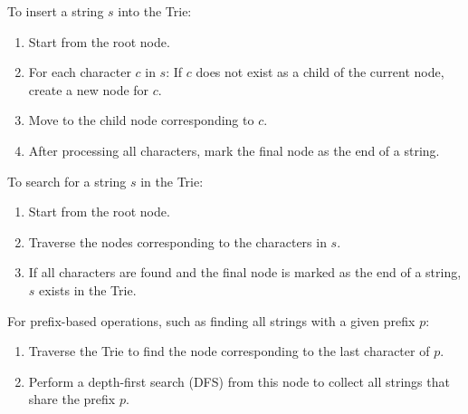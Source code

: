 \begin{tcolorbox}[colframe = blue, title={Reference Reading}, colback = white, enhanced, breakable, 
    skin first=enhanced,
    skin middle=enhanced,
    skin last=enhanced,
    before upper={\parindent15pt}]
To insert a string $s$ into the Trie:
\begin{enumerate}[label=(\arabic*)]
    \item Start from the root node.
    \item For each character $c$ in $s$: If $c$ does not exist as a child of the current node, create a new node for $c$.
    \item Move to the child node corresponding to $c$.
    \item After processing all characters, mark the final node as the end of a string.
\end{enumerate}

To search for a string $s$ in the Trie:
\begin{enumerate}[label=(\arabic*)]
    \item Start from the root node.
    \item Traverse the nodes corresponding to the characters in $s$.
    \item If all characters are found and the final node is marked as the end of a string, $s$ exists in the Trie.
\end{enumerate}

For prefix-based operations, such as finding all strings with a given prefix $p$:
\begin{enumerate}[label=(\arabic*)]
    \item Traverse the Trie to find the node corresponding to the last character of $p$.
    \item Perform a depth-first search (DFS) from this node to collect all strings that share the prefix $p$.
\end{enumerate}

\end{tcolorbox}

